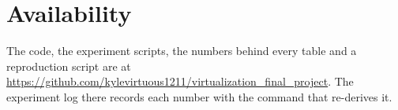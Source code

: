 \section*{Availability}

The code, the experiment scripts, the numbers behind every table and a reproduction script are at \url{https://github.com/kylevirtuous1211/virtualization_final_project}.
The experiment log there records each number with the command that re-derives it.
